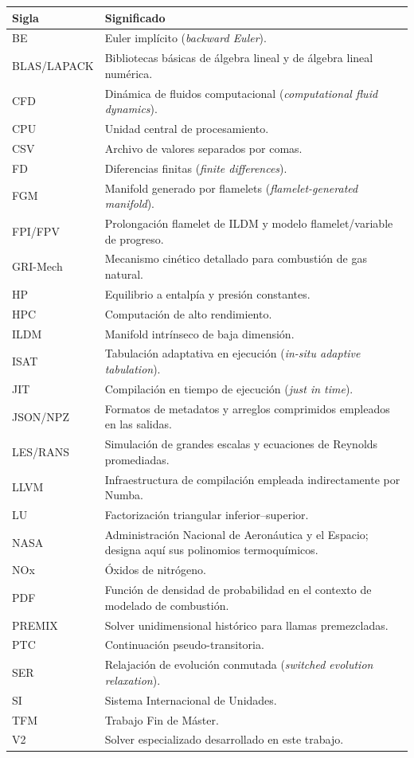 \documentclass[12pt,a4paper,twoside,openany]{book}
\newcommand{\Vdos}{\textsc{V2}\xspace}
\begin{document}
\begin{longtable}{@{}p{}p{}@{}}
\toprule
\textbf{Sigla} & \textbf{Significado} \\
\midrule
\endhead
BE & Euler implícito (\emph{backward Euler}). \\
BLAS/LAPACK & Bibliotecas básicas de álgebra lineal y de álgebra lineal numérica. \\
CFD & Dinámica de fluidos computacional (\emph{computational fluid dynamics}). \\
CPU & Unidad central de procesamiento. \\
CSV & Archivo de valores separados por comas. \\
FD & Diferencias finitas (\emph{finite differences}). \\
FGM & Manifold generado por flamelets (\emph{flamelet-generated manifold}). \\
FPI/FPV & Prolongación flamelet de ILDM y modelo flamelet/variable de progreso. \\
GRI-Mech & Mecanismo cinético detallado para combustión de gas natural. \\
HP & Equilibrio a entalpía y presión constantes. \\
HPC & Computación de alto rendimiento. \\
ILDM & Manifold intrínseco de baja dimensión. \\
ISAT & Tabulación adaptativa en ejecución (\emph{in-situ adaptive tabulation}). \\
JIT & Compilación en tiempo de ejecución (\emph{just in time}). \\
JSON/NPZ & Formatos de metadatos y arreglos comprimidos empleados en las salidas. \\
LES/RANS & Simulación de grandes escalas y ecuaciones de Reynolds promediadas. \\
LLVM & Infraestructura de compilación empleada indirectamente por Numba. \\
LU & Factorización triangular inferior--superior. \\
NASA & Administración Nacional de Aeronáutica y el Espacio; designa aquí sus polinomios termoquímicos. \\
NOx & Óxidos de nitrógeno. \\
PDF & Función de densidad de probabilidad en el contexto de modelado de combustión. \\
PREMIX & Solver unidimensional histórico para llamas premezcladas. \\
PTC & Continuación pseudo-transitoria. \\
SER & Relajación de evolución conmutada (\emph{switched evolution relaxation}). \\
SI & Sistema Internacional de Unidades. \\
TFM & Trabajo Fin de Máster. \\
\Vdos & Solver especializado desarrollado en este trabajo. \\
\bottomrule
\end{longtable}
\end{document}
